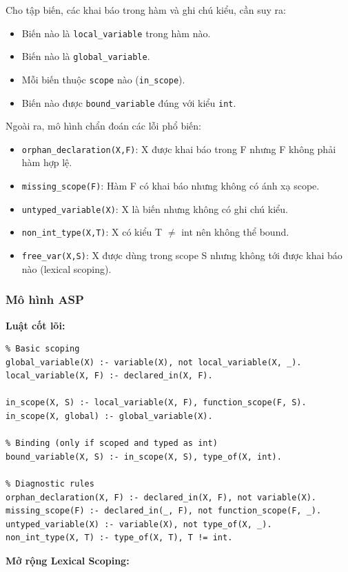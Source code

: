 \documentclass[a4paper,11pt]{article}
\begin{document}
Cho tập biến, các khai báo trong hàm và ghi chú kiểu, cần suy ra:
\begin{itemize}
  \item Biến nào là \texttt{local\_variable} trong hàm nào.
  \item Biến nào là \texttt{global\_variable}.
  \item Mỗi biến thuộc \texttt{scope} nào (\texttt{in\_scope}).
  \item Biến nào được \texttt{bound\_variable} đúng với kiểu \texttt{int}.
\end{itemize}

Ngoài ra, mô hình chẩn đoán các lỗi phổ biến:
\begin{itemize}
  \item \texttt{orphan\_declaration(X,F)}: X được khai báo trong F nhưng F không phải hàm hợp lệ.
  \item \texttt{missing\_scope(F)}: Hàm F có khai báo nhưng không có ánh xạ scope.
  \item \texttt{untyped\_variable(X)}: X là biến nhưng không có ghi chú kiểu.
  \item \texttt{non\_int\_type(X,T)}: X có kiểu T $\neq$ int nên không thể bound.
  \item \texttt{free\_var(X,S)}: X được dùng trong scope S nhưng không tới được khai báo nào (lexical scoping).
\end{itemize}

\subsubsection*{Mô hình ASP}

\textbf{Luật cốt lõi:}
\begin{lstlisting}
% Basic scoping
global_variable(X) :- variable(X), not local_variable(X, _).
local_variable(X, F) :- declared_in(X, F).

in_scope(X, S) :- local_variable(X, F), function_scope(F, S).
in_scope(X, global) :- global_variable(X).

% Binding (only if scoped and typed as int)
bound_variable(X, S) :- in_scope(X, S), type_of(X, int).

% Diagnostic rules
orphan_declaration(X, F) :- declared_in(X, F), not variable(X).
missing_scope(F) :- declared_in(_, F), not function_scope(F, _).
untyped_variable(X) :- variable(X), not type_of(X, _).
non_int_type(X, T) :- type_of(X, T), T != int.
\end{lstlisting}

\textbf{Mở rộng Lexical Scoping:}
\end{document}
